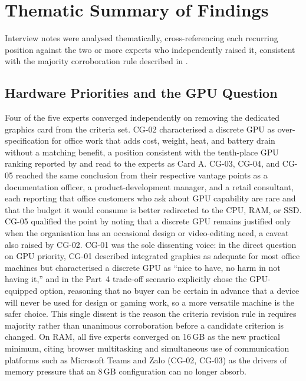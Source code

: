 \section{Thematic Summary of Findings}\label{app:interview-summary}

Interview notes were analysed thematically, cross-referencing each recurring position
against the two or more experts who independently raised it, consistent with the majority
corroboration rule described in .

\subsection{Hardware Priorities and the GPU Question}

Four of the five experts converged independently on removing the dedicated graphics card
from the criteria set. CG-02 characterised a discrete GPU as over-specification for office
work that adds cost, weight, heat, and battery drain without a matching benefit, a position
consistent with the tenth-place GPU ranking reported by \textcite{maghsoudi_hybrid_2026}
and read to the experts as Card A. CG-03, CG-04, and CG-05 reached the same conclusion from
their respective vantage points as a documentation officer, a product-development manager,
and a retail consultant, each reporting that office customers who ask about GPU capability
are rare and that the budget it would consume is better redirected to the CPU, RAM, or SSD.
CG-05 qualified the point by noting that a discrete GPU remains justified only when the
organisation has an occasional design or video-editing need, a caveat also raised by CG-02.
CG-01 was the sole dissenting voice: in the direct question on GPU priority, CG-01 described
integrated graphics as adequate for most office machines but characterised a discrete GPU as
``nice to have, no harm in not having it,'' and in the Part~4 trade-off scenario explicitly
chose the GPU-equipped option, reasoning that no buyer can be certain in advance that a
device will never be used for design or gaming work, so a more versatile machine is the
safer choice. This single dissent is the reason the criteria revision rule in
 requires majority rather than unanimous corroboration before
a candidate criterion is changed. On RAM, all five experts converged on 16\,GB as the new
practical minimum, citing browser multitasking and simultaneous use of communication
platforms such as Microsoft Teams and Zalo (CG-02, CG-03) as the drivers of memory pressure
that an 8\,GB configuration can no longer absorb.

